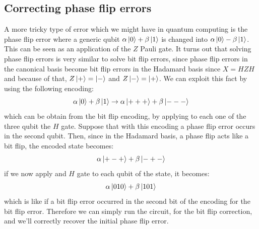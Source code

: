 \documentclass{article}
\begin{document}
	\subsection{Correcting phase flip errors}
	A more tricky type of error which we might have in quantum computing is the phase flip error where a generic qubit $\alpha \ket{0} + \beta\ket{1}$ is changed into $\alpha\ket{0} - \beta\ket{1}$. This can be seen as an application of the $Z$ Pauli gate. It turns out that solving phase flip errors is very similar to solve bit flip errors, since phase flip errors in the canonical basis become bit flip errors in the Hadamard basis since $X = HZH$ and because of that, $Z\ket{+} = \ket{-}$ and $Z\ket{-} = \ket{+}$. We can exploit this fact by using the following encoding:
	\[ \alpha\ket{0} + \beta\ket{1} \rightarrow \alpha\ket{+++} + \beta\ket{---}\]
	which can be obtain from the bit flip encoding, by applying to each one of the three qubit the $H$ gate. Suppose that with this encoding a phase flip error occurs in the second qubit. Then, since in the Hadamard basis, a phase flip acts like a bit flip, the encoded state becomes:
	\[  \alpha\ket{+-+} + \beta\ket{-+-} \]
	if we now apply and $H$ gate to each qubit of the state, it becomes:
	\[  \alpha\ket{010} + \beta\ket{101} \]
	which is like if a bit flip error occurred in the second bit of the encoding for the bit flip error. Therefore we can simply run the circuit, for the bit flip correction, and we'll correctly recover the initial phase flip error.	
	
\end{document}
